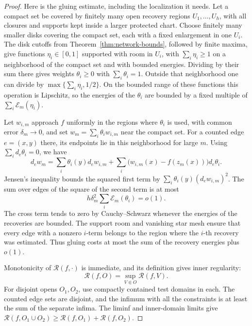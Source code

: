 \begin{proof}
Here is the gluing estimate, including the localization it needs.  Let a
compact set be covered by finitely many open recovery regions
\(U_1,\ldots,U_h\), with all closures and supports kept inside a larger
protected chart.  Choose finitely many smaller disks covering the compact
set, each with a fixed enlargement in one \(U_i\).  The disk cutoffs from
Theorem~\ref{thm:network-bounds}, followed by finite maxima, give functions
\(\eta_i\in[0,1]\) supported with room in \(U_i\), with
\(\sum_i\eta_i\ge1\) on a neighborhood of the compact set and with
bounded energies.  Dividing by their sum there gives weights
\(\theta_i\ge0\) with \(\sum_i\theta_i=1\).  Outside that neighborhood
one can divide by \(\max\{\sum_i\eta_i,1/2\}\).  On the bounded range of
these functions this operation is Lipschitz, so the energies of the
\(\theta_i\) are bounded by a fixed multiple of
\(\sum_i\mathcal E_m(\eta_i)\).

Let \(w_{i,m}\) approach \(f\) uniformly in the regions where \(\theta_i\)
is used, with common error \(\delta_m\to0\), and set
\(w_m=\sum_i\theta_i w_{i,m}\) near the compact set.  For a counted edge
\(e=(x,y)\) there, its endpoints lie in this neighborhood for large \(m\).
Using \(\sum_i d_e\theta_i=0\), we have
\begin{equation}\label{eq:edge-gluing}
 d_e w_m
 =\sum_i\theta_i(y)d_e w_{i,m}
   +\sum_i\bigl(w_{i,m}(x)-f(z_m(x))\bigr)d_e\theta_i.
\end{equation}
Jensen's inequality bounds the squared first term by
\(\sum_i\theta_i(y)(d_e w_{i,m})^2\).  The sum over edges of the square
of the second term is at most
\[
 h\delta_m^2\sum_i\mathcal E_m(\theta_i)=o(1).
\]
The cross term tends to zero by Cauchy--Schwarz whenever the energies of the
recoveries are bounded.  The support room and vanishing star mesh ensure
that every edge with a nonzero \(i\)-term belongs to the region where the
\(i\)-th recovery was estimated.  Thus gluing costs at most the sum of the
recovery energies plus \(o(1)\).

Monotonicity of \(\mathcal R(f,\cdot)\) is immediate, and its definition
gives inner regularity:
\[
 \mathcal R(f,O)=\sup_{V\Subset O}\mathcal R(f,V).
\]
For disjoint opens \(O_1,O_2\), use compactly contained test domains in
each.  The counted edge sets are disjoint, and the infimum with all the
constraints is at least the sum of the separate infima.  The liminf and
inner-domain limits give
\(\mathcal R(f,O_1\cup O_2)\ge
  \mathcal R(f,O_1)+\mathcal R(f,O_2)\).


\end{proof}
